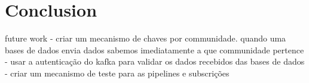 \chapter{Conclusion}
\label{chapter:conclusion}

future work
- criar um mecanismo de chaves por communidade. quando uma bases de dados envia dados sabemos imediatamente a que communidade pertence
- usar a autenticação do kafka para validar os dados recebidos das bases de dados
- criar um mecanismo de teste para as pipelines e subscrições
